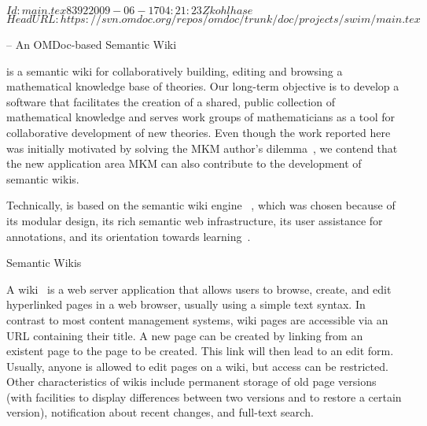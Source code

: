 \svnInfo $Id: main.tex 8392 2009-06-17 04:21:23Z kohlhase $
\svnKeyword $HeadURL: https://svn.omdoc.org/repos/omdoc/trunk/doc/projects/swim/main.tex $

\begin{omgroup}[id=swim,creators={clange,miko}]{{\swim} -- An OMDoc-based Semantic Wiki}

{\swim} is a semantic wiki for collaboratively building, editing and browsing a
mathematical knowledge base of {\omdoc} theories. Our long-term objective is to develop a
software that facilitates the creation of a shared, public collection of mathematical
knowledge and serves work groups of mathematicians as a tool for collaborative development
of new theories.  Even though the work reported here was initially motivated by solving
the MKM author's dilemma~\cite{KohKoh:cdad04}, we contend that the new application area
MKM can also contribute to the development of semantic wikis.

Technically, {\swim} is based on the semantic wiki engine
~\cite{schaffert06:ikewiki}, which was chosen because of its
modular design, its rich semantic web infrastructure, its user assistance for
annotations, and its orientation towards
learning~\cite{schaffert06:learning-with-semantic-wikis}.

\begin{omgroup}{Semantic Wikis}

A wiki~\cite{LeuCun01:wikiway} is a web server
application that allows users to browse, create, and edit hyperlinked pages in a web
browser, usually using a simple text syntax.  In contrast to most content management
systems, wiki pages are accessible via an URL containing their title.  A new page can be
created by linking from an existent page to the page to be created.  This link will then
lead to an edit form.  Usually, anyone is allowed to edit pages on a wiki, but access can
be restricted.  Other characteristics of wikis include permanent storage of old page
versions (with facilities to display differences between two versions and to restore a
certain version), notification about recent changes, and full-text search.


\end{omgroup}
\end{omgroup}
